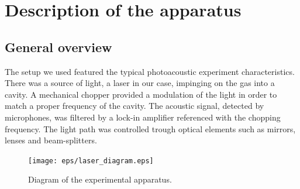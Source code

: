 \chapter{Description of the apparatus}
\section{General overview}
The setup we used featured the typical photoacoustic experiment characteristics. There was a source of light, a laser in our case, impinging on the gas into a cavity. A mechanical chopper provided a modulation of the light in order to match a proper frequency of the cavity. The acoustic signal, detected by microphones, was filtered by a lock-in amplifier referenced with the chopping frequency. The light path was controlled trough optical elements such as mirrors, lenses and beam-splitters. 
\begin{figure}[!bhpt]\centering
\texttt{[image: eps/laser\_diagram.eps]}
\caption{Diagram of the experimental apparatus.}
\label{diagram}
\end{figure}

